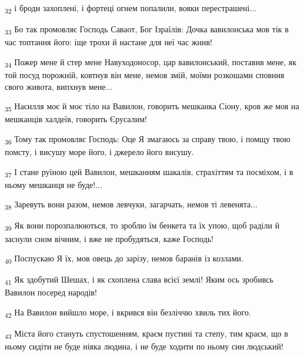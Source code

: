 \begin{tcolorbox}
\textsubscript{32} і броди захоплені, і фортеці огнем попалили, вояки перестрашені...
\end{tcolorbox}
\begin{tcolorbox}
\textsubscript{33} Бо так промовляє Господь Саваот, Бог Ізраїлів: Дочка вавилонська мов тік в час топтання його: іще трохи й настане для неї час жнив!
\end{tcolorbox}
\begin{tcolorbox}
\textsubscript{34} Пожер мене й стер мене Навуходоносор, цар вавилонський, поставив мене, як той посуд порожній, ковтнув він мене, немов змій, моїми розкошами сповнив свого живота, випхнув мене...
\end{tcolorbox}
\begin{tcolorbox}
\textsubscript{35} Насилля моє й моє тіло на Вавилон, говорить мешканка Сіону, кров же моя на мешканців халдеїв, говорить Єрусалим!
\end{tcolorbox}
\begin{tcolorbox}
\textsubscript{36} Тому так промовляє Господь: Оце Я змагаюсь за справу твою, і помщу твою помсту, і висушу море його, і джерело його висушу.
\end{tcolorbox}
\begin{tcolorbox}
\textsubscript{37} І стане руїною цей Вавилон, мешканням шакалів, страхіттям та посміхом, і в ньому мешканця не буде!...
\end{tcolorbox}
\begin{tcolorbox}
\textsubscript{38} Заревуть вони разом, немов левчуки, загарчать, немов ті левенята...
\end{tcolorbox}
\begin{tcolorbox}
\textsubscript{39} Як вони порозпалюються, то зроблю їм бенкета та їх упою, щоб раділи й заснули сном вічним, і вже не пробудяться, каже Господь!
\end{tcolorbox}
\begin{tcolorbox}
\textsubscript{40} Поспускаю Я їх, мов овець до зарізу, немов баранів із козлами.
\end{tcolorbox}
\begin{tcolorbox}
\textsubscript{41} Як здобутий Шешах, і як схоплена слава всієї землі! Яким ось зробивсь Вавилон посеред народів!
\end{tcolorbox}
\begin{tcolorbox}
\textsubscript{42} На Вавилон вийшло море, і вкрився він безліччю хвиль тих його.
\end{tcolorbox}
\begin{tcolorbox}
\textsubscript{43} Міста його стануть спустошенням, краєм пустині та степу, тим краєм, що в ньому сидіти не буде ніяка людина, і не буде ходити по ньому син людський!
\end{tcolorbox}
